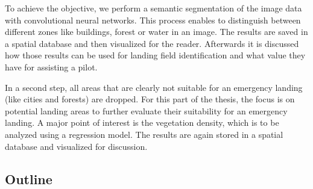 To achieve the objective, we perform a semantic segmentation of the image data with convolutional neural networks. This process enables to distinguish between different zones like buildings, forest or water in an image. The results are saved in a spatial database and then visualized for the reader. Afterwards it is discussed how those results can be used for landing field identification and what value they have for assisting a pilot.

In a second step, all areas that are clearly not suitable for an emergency landing (like cities and forests) are dropped. For this part of the thesis, the focus is on potential landing areas to further evaluate their suitability for an emergency landing. A major point of interest is the vegetation density, which is to be analyzed using a regression model. The results are again stored in a spatial database and visualized for discussion.

\subsection{Outline}

\newpage